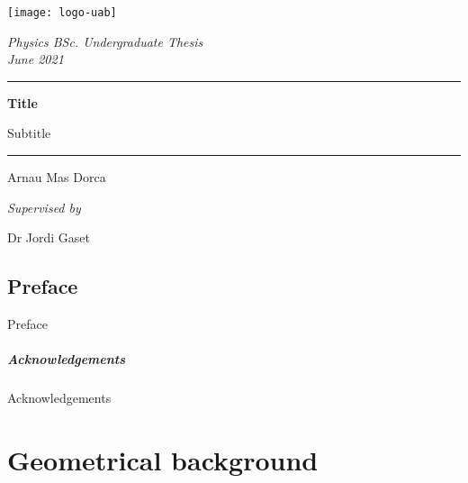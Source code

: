 \documentclass[12pt, oneside]{book}
\title{}
\author{Arnau Mas}
\date{}
\begin{document}
\begin{titlepage}
	\centering \sffamily

	\vspace*{2cm}

	\texttt{[image: logo-uab]}

	\vspace{2cm}

	{\Large \itshape Physics BSc. Undergraduate Thesis} \\
	{\large \itshape June 2021}

	\vspace{10pt}
	\hrule
	\vspace{10pt}
	{\bfseries \LARGE Title}

	{\Large Subtitle}
	\vspace{10pt}
	\hrule		
	\vspace{2cm}

	{\LARGE Arnau Mas Dorca}

	\vspace{1cm}
	{\large \itshape Supervised by}

	{\Large Dr Jordi Gaset}
\end{titlepage}
\thispagestyle{empty}

\pagestyle{plain}
\frontmatter
{\footnotesize \sffamily \tableofcontents}

\pagebreak
{}
\section*{Preface}
Preface

\paragraph{Acknowledgements}
Acknowledgements

\mainmatter
\pagestyle{main}

\chapter{Geometrical background}\label{ch:problem}


\backmatter
\pagestyle{plain}
\printbibliography
\end{document}
